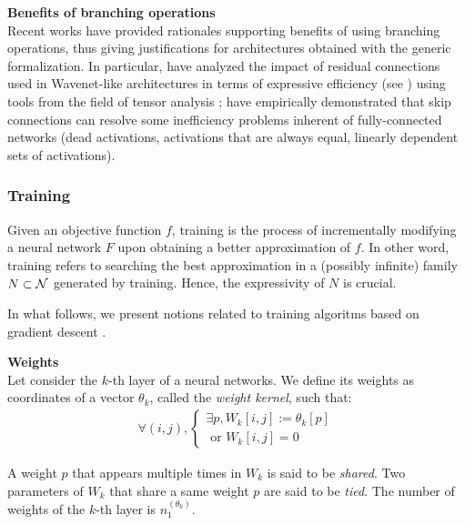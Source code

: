 \begin{remark}\textbf{Benefits of branching operations}\\
Recent works have provided rationales supporting benefits of using branching operations, thus giving justifications for architectures obtained with the generic formalization. In particular, \citep{cohen2018boosting} have analyzed the impact of residual connections used in Wavenet-like architectures \citep{van2016wavenet} in terms of expressive efficiency (see ) using tools from the field of tensor analysis ; \citep{orhan2018skip} have empirically demonstrated that skip connections can resolve some inefficiency problems inherent of fully-connected networks (dead activations, activations that are always equal, linearly dependent sets of activations).

\end{remark}

\subsubsection{Training}
\label{sec:training}

Given an objective function $f$, training is the process of incrementally modifying a neural network $F$ upon obtaining a better approximation of $f$. In other word, training refers to searching the best approximation in a (possibly infinite) family $N \subset \mathcal{N}$ generated by training. Hence, the expressivity of $N$ is crucial.

In what follows, we present notions related to training algoritms based on gradient descent \citep{widrow1960adaptive}.


\begin{definition}\textbf{Weights}\\
Let consider the $k$-th layer of a neural networks. We define its weights as coordinates of a vector $\theta_k$, called the \emph{weight kernel}, such that:
\begin{gather*}
  \forall (i,j),
    \begin{cases}
      \exists p, W_k[i,j] := \theta_k[p] \\
      \text{ or } W_k[i,j] = 0
    \end{cases}
\end{gather*}
\end{definition}
A weight $p$ that appears multiple times in $W_k$ is said to be \emph{shared}. Two parameters of $W_k$ that share a same weight $p$ are said to be \emph{tied}. The number of weights of the $k$-th layer is $n_1^{(\theta_k)}$.

